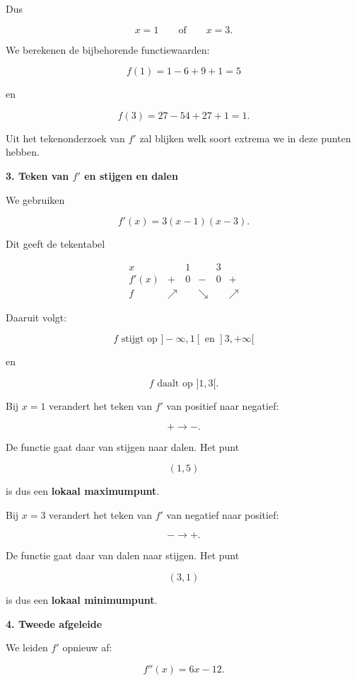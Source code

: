 \documentclass{ximera}
\begin{document}
\begin{oefening}{\oefU\ESS}
\begin{oplossing}
  Dus
  
  \[
  x=1
  \qquad\text{of}\qquad
  x=3.
  \]
  
  We berekenen de bijbehorende functiewaarden:
  
  \[
  f(1)=1-6+9+1=5
  \]
  
  en
  
  \[
  f(3)=27-54+27+1=1.
  \]
  
  Uit het tekenonderzoek van $f'$ zal blijken welk soort extrema
  we in deze punten hebben.
  
  \textbf{3. Teken van $f'$ en stijgen en dalen}
  
  We gebruiken
  
  \[
  f'(x)=3(x-1)(x-3).
  \]
  
  Dit geeft de tekentabel
  
  \[
  \begin{array}{c|ccccc}
  x
  &
  & 1
  &
  & 3
  &
  \\ \hline
  f'(x)
  & +
  & 0
  & -
  & 0
  & +
  \\
  f
  & \nearrow
  &
  & \searrow
  &
  & \nearrow
  \end{array}
  \]
  
  Daaruit volgt:
  
  \[
  \boxed{
  f \text{ stijgt op }]-\infty,1[
  \text{ en } ]3,+\infty[
  }
  \]
  
  en
  
  \[
  \boxed{
  f \text{ daalt op }]1,3[.
  }
  \]
  
  Bij $x=1$ verandert het teken van $f'$ van positief naar negatief:
  
  \[
  +\longrightarrow-.
  \]
  
  De functie gaat daar van stijgen naar dalen. Het punt
  
  \[
  \boxed{(1,5)}
  \]
  
  is dus een \textbf{lokaal maximumpunt}.
  
  Bij $x=3$ verandert het teken van $f'$ van negatief naar positief:
  
  \[
  -\longrightarrow+.
  \]
  
  De functie gaat daar van dalen naar stijgen. Het punt
  
  \[
  \boxed{(3,1)}
  \]
  
  is dus een \textbf{lokaal minimumpunt}.
  
  \textbf{4. Tweede afgeleide}
  
  We leiden $f'$ opnieuw af:
  
  \[
  f''(x)=6x-12.
  \]
  

\end{oplossing}
\end{oefening}
\end{document}
